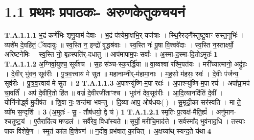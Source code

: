 \documentclass[17pt]{extarticle}
\begin{document}
\section*{ 1.1     प्रथमः प्रपाठकः- अरुणकेतुकचयनं }
                                \textbf{ T.A.1.1.1} \newline
                  भ॒द्रं कर्णे॑भिः शृणु॒याम॑ देवाः ।  भ॒द्रं प॑श्येमा॒क्षभि॒र् यज॑त्राः ।  स्थि॒रैरङ्गै᳚स्तुष्टु॒वाꣳ स॑स्त॒नूभिः॑ । व्यशे॑म दे॒वहि॑तं॒ ॅयदायुः॑ ॥  स्व॒स्ति न॒ इन्द्रो॑ वृ॒द्धश्र॑वाः ।  स्व॒स्ति नः॑ पू॒षा वि॒श्ववे॑दाः ।  स्व॒स्ति न॒स्तार्क्ष्यो॒ अरि॑ष्टनेमिः ।  स्व॒स्ति नो॒ बृह॒स्पति॑र्-दधातु ॥  आप॑मापाम॒पः सर्वाः᳚ ।  अ॒स्मा-द॒स्मा-दि॒तोऽमुतः॑ \textbf{ 1} \newline
                  \newline
                                                                  \textbf{ T.A.1.1.2} \newline
                  अ॒ग्निर्वा॒युश्च॒ सूर्य॑श्च । स॒ह स॑ञ्च-स्क॒रर्द्धि॑या ॥ वा॒य्वश्वा॑ रश्मि॒पत॑यः । मरी᳚च्यात्मानो॒ अद्रु॑हः । दे॒वीर् भु॑वन॒ सूव॑रीः । पु॒त्र॒व॒त्त्वाय॑ मे सुत ॥ महानाम्नीर्-म॑हामा॒नाः । म॒ह॒सो म॑हसः॒ स्वः॑ ।  दे॒वीः प॑र्जन्य॒ सूव॑रीः । पु॒त्र॒व॒त्त्वाय॑ मे सुत । \textbf{ 2} \newline
                  \newline
                                                                  \textbf{ T.A.1.1.3} \newline
                  अ॒पाश्न्यु॑ष्णि-म॒पा रक्षः॑ । अ॒पाश्न्यु॑ष्णि-म॒पा रघं᳚ । अपा᳚घ्रा॒मप॑ चा॒वर्तिं᳚ । अप॑ दे॒वीरि॒तो हि॑त ॥ वज्रं॑ दे॒वीरजी॑ताꣳश्च ।  भुव॑नं देव॒सूव॑रीः । आ॒दि॒त्यानदि॑तिं दे॒वीं । योनि॑नोर्द्ध्व-मु॒दीष॑त ॥ शि॒वा नः॒ शन्त॑मा भवन्तु । दि॒व्या आप॒ ओष॑धयः( ) ।  सु॒मृ॒डी॒का सर॑स्वति । मा ते॒ व्यो॑म स॒न्दृशि॑ । \textbf{ 3} \newline
                  \newline
                                                        (अ॒मुतः॑ - सु॒ - तौष॑धयो॒ द्वे च॑ ) \textbf{1} \newline \newline
                                \textbf{ T.A.1.2.1} \newline
                  स्मृतिः॑ प्र॒त्यक्ष॑-मैति॒ह्यं᳚ । अनु॑मान-श्चतुष्ट॒यं । ए॒तैरादि॑त्य मण्डलं ।  सर्वै॑रेव॒ विधा᳚स्यते ॥ सूर्यो॒ मरी॑चि॒माद॑त्ते । सर्वस्मा᳚द् भुव॑नाद॒धि । तस्याः पाक वि॑शेषे॒ण । स्मृ॒तं का॑ल वि॒शेष॑णं ॥  न॒दीव॒ प्रभ॑वात् का॒चित् । अ॒क्षय्या᳚थ् स्यन्द॒ते य॑था \textbf{ 4} \newline
                  \newline
\end{document}
